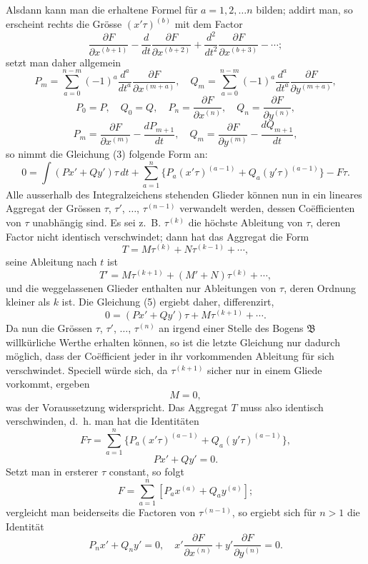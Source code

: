 \documentclass[11pt,a4paper,leqno]{article}
\begin{document}
Alsdann kann man die erhaltene Formel für $a=1,2,\ldots n$ bilden; addirt man, so erscheint rechts die Grösse $(x'\tau)^{(b)}$ mit dem Factor
\[
\frac{\partial F}{\partial x^{(b+1)}}
-\frac{d}{dt}\frac{\partial F}{\partial x^{(b+2)}}
+\frac{d^2}{dt^2}\frac{\partial F}{\partial x^{(b+3)}}-\cdots;
\]
setzt man daher allgemein
\[
P_m=\sum_{a=0}^{n-m}(-1)^a\frac{d^a}{dt^a}\frac{\partial F}{\partial x^{(m+a)}},
\quad
Q_m=\sum_{a=0}^{n-m}(-1)^a\frac{d^a}{dt^a}\frac{\partial F}{\partial y^{(m+a)}},
\]
\[
P_0=P,\quad Q_0=Q,
\quad P_n=\frac{\partial F}{\partial x^{(n)}},
\quad Q_n=\frac{\partial F}{\partial y^{(n)}},
\]
\begin{equation}\tag{4}
P_m=\frac{\partial F}{\partial x^{(m)}}-\frac{dP_{m+1}}{dt},
\quad
Q_m=\frac{\partial F}{\partial y^{(m)}}-\frac{dQ_{m+1}}{dt},
\end{equation}
so nimmt die Gleichung (3) folgende Form an:
\begin{equation}\tag{5}
0=\int(Px'+Qy')\tau\,dt
+\sum_{a=1}^n\{P_a(x'\tau)^{(a-1)}+Q_a(y'\tau)^{(a-1)}\}-F\tau.
\end{equation}
Alle ausserhalb des Integralzeichens stehenden Glieder können nun in ein lineares Aggregat der Grössen $\tau$, $\tau'$, $\ldots$, $\tau^{(n-1)}$ verwandelt werden, dessen Coëfficienten von $\tau$ unabhängig sind. Es sei z.~B. $\tau^{(k)}$ die höchste Ableitung von $\tau$, deren Factor nicht identisch verschwindet; dann hat das Aggregat die Form
\[
T=M\tau^{(k)}+N\tau^{(k-1)}+\cdots,
\]
seine Ableitung nach $t$ ist
\[
T'=M\tau^{(k+1)}+(M'+N)\tau^{(k)}+\cdots,
\]
und die weggelassenen Glieder enthalten nur Ableitungen von $\tau$, deren Ordnung kleiner als $k$ ist. Die Gleichung (5) ergiebt daher, differenzirt,
\[
0=(Px'+Qy')\tau+M\tau^{(k+1)}+\cdots.
\]
Da nun die Grössen $\tau$, $\tau'$, $\ldots$, $\tau^{(n)}$ an irgend einer Stelle des Bogens $\mathfrak B$ willkürliche Werthe erhalten können, so ist die letzte Gleichung nur dadurch möglich, dass der Coëfficient jeder in ihr vorkommenden Ableitung für sich verschwindet. Speciell würde sich, da $\tau^{(k+1)}$ sicher nur in einem Gliede vorkommt, ergeben
\[
M=0,
\]
was der Voraussetzung widerspricht. Das Aggregat $T$ muss also identisch verschwinden, d.~h. man hat die Identitäten
\[
F\tau=\sum_{a=1}^n\{P_a(x'\tau)^{(a-1)}+Q_a(y'\tau)^{(a-1)}\},
\]
\begin{equation}\tag{6}
Px'+Qy'=0.
\end{equation}
Setzt man in ersterer $\tau$ constant, so folgt
\begin{equation}\tag{7}
F=\sum_{a=1}^n[P_ax^{(a)}+Q_ay^{(a)}];
\end{equation}
vergleicht man beiderseits die Factoren von $\tau^{(n-1)}$, so ergiebt sich für $n>1$ die Identität
\begin{equation}\tag{8}
P_nx'+Q_ny'=0,
\quad
x'\frac{\partial F}{\partial x^{(n)}}+y'\frac{\partial F}{\partial y^{(n)}}=0.
\end{equation}
\end{document}
